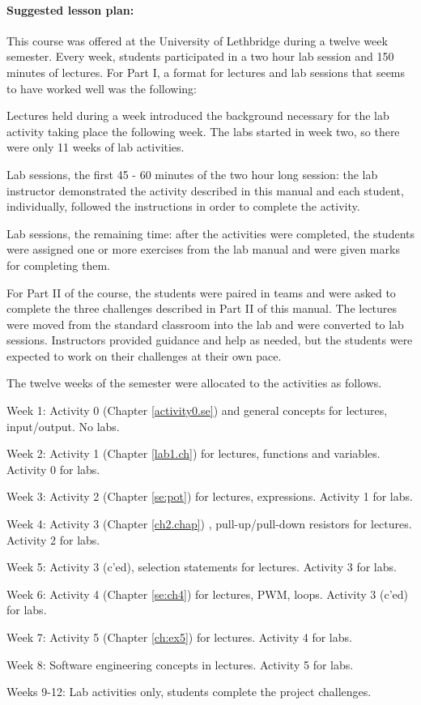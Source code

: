 \documentclass[12pt]{book}
\begin{document}
\paragraph{Suggested lesson plan:} This course was offered at the
University of Lethbridge during a twelve week semester. Every week,
students participated in a two hour lab session and 150 minutes of
lectures. For Part I, a format for lectures and lab sessions that
seems to have worked well was the following:
\begin{compactitem}[--]
  \item Lectures held during a week introduced the background
    necessary for the lab activity taking place the following
    week. The labs started in week two, so there were only 11 weeks of
    lab activities.
  \item Lab sessions, the first 45 - 60 minutes of the two hour long
    session: the lab instructor demonstrated the activity described in
    this manual and each student, individually, followed the
    instructions in order to complete the activity.
  \item Lab sessions, the remaining time: after the activities were
    completed, the students were assigned one or more exercises from
    the lab manual and were given marks for completing them.
\end{compactitem}

For Part II of the course, the students were paired in teams and were
asked to complete the three challenges described in Part II of this
manual. The lectures were moved from the standard classroom into the
lab and were converted to lab sessions. Instructors provided guidance
and help as needed, but the students were expected to work on their
challenges at their own pace.

The twelve weeks of the semester were allocated to the activities as
follows.
\begin{compactitem}
\item[Week 1:] Activity 0 (Chapter \ref{activity0.se}) and general
  concepts for lectures, input/output. No labs.
\item[Week 2:] Activity 1 (Chapter
  \ref{lab1.ch}) for lectures, functions and variables. Activity 0 for labs.
\item[Week 3:] Activity 2 (Chapter \ref{se:pot}) for
  lectures, expressions. Activity 1 for labs.
\item[Week 4:] Activity 3 (Chapter \ref{ch2.chap}) , pull-up/pull-down
  resistors for lectures. Activity 2 for labs.
\item[Week 5:] Activity 3 (c'ed), selection statements for
  lectures. Activity 3 for labs.
\item[Week 6:] Activity 4 (Chapter \ref{se:ch4}) for lectures, PWM,
  loops. Activity 3 (c'ed) for labs.
\item[Week 7:] Activity 5 (Chapter \ref{ch:ex5}) for lectures. Activity
  4 for labs.
\item[Week 8:] Software engineering concepts in lectures. Activity 5
  for labs.
\item[Weeks 9-12:] Lab activities only, students complete the project
  challenges. 
\end{compactitem}
\end{document}
